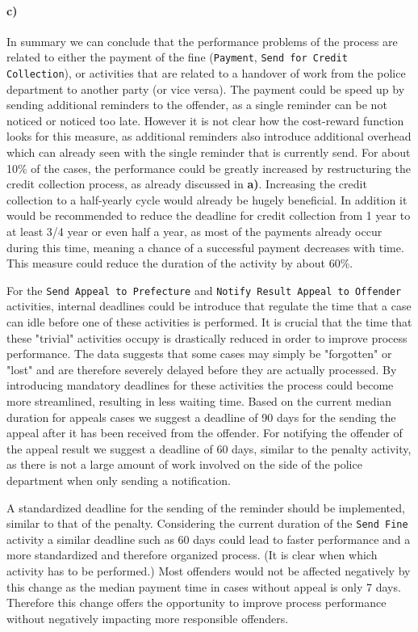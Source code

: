 \documentclass[12pt]{report}
\begin{document}
\paragraph{\textbf{c)}}

In summary we can conclude that the performance problems of the process are related to either the payment of the fine (\texttt{Payment}, \texttt{Send for Credit Collection}), or activities that are related to a handover of work from the police department to another party (or vice versa). The payment could be speed up by sending additional reminders to the offender, as a single reminder can be not noticed or noticed too late. However it is not clear how the cost-reward function looks for this measure, as additional reminders also introduce additional overhead which can already seen with the single reminder that is currently send. For about 10\% of the cases, the performance could be greatly increased by restructuring the credit collection process, as already discussed in \textbf{a)}. Increasing the credit collection to a half-yearly cycle would already be hugely beneficial. In addition it would be recommended to reduce the deadline for credit collection from 1 year to at least 3/4 year or even half a year, as most of the payments already occur during this time, meaning a chance of a successful payment decreases with time. This measure could reduce the duration of the activity by about 60\%.

For the \texttt{Send Appeal to Prefecture} and \texttt{Notify Result Appeal to Offender} activities, internal deadlines could be introduce that regulate the time that a case can idle before one of these activities is performed. It is crucial that the time that these "trivial" activities occupy is drastically reduced in order to improve process performance. The data suggests that some cases may simply be "forgotten" or "lost" and are therefore severely delayed before they are actually processed. By introducing mandatory deadlines for these activities the process could become more streamlined, resulting in less waiting time. Based on the current median duration for appeals cases we suggest a deadline of 90 days for the sending the appeal after it has been received from the offender. For notifying the offender of the appeal result we suggest a deadline of 60 days, similar to the penalty activity, as there is not a large amount of work involved on the side of the police department when only sending a notification.

A standardized deadline for the sending of the reminder should be implemented, similar to that of the penalty. Considering the current duration of the \texttt{Send Fine} activity a similar deadline such as 60 days could lead to faster performance and a more standardized and therefore organized process. (It is clear when which activity has to be performed.) Most offenders would not be affected negatively by this change as the median payment time in cases without appeal is only 7 days. Therefore this change offers the opportunity to improve process performance without negatively impacting more responsible offenders.
\end{document}

